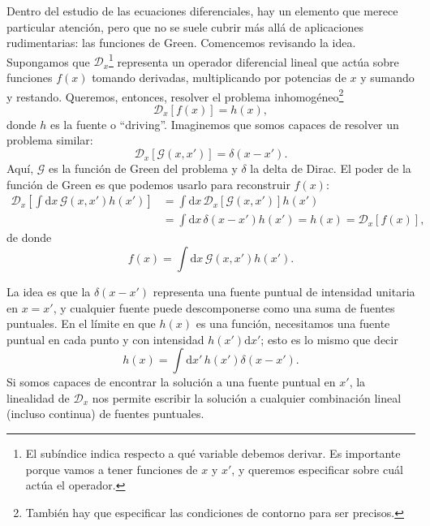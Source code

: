 Dentro del estudio de las ecuaciones diferenciales, hay un elemento que merece particular atención, pero que no se suele cubrir más allá de aplicaciones rudimentarias: las funciones de Green. Comencemos revisando la idea. Supongamos que \(\mathcal{D}_x\)\footnote{El subíndice indica respecto a qué variable debemos derivar. Es importante porque vamos a tener funciones de \(x\) y \(x'\), y queremos especificar sobre cuál actúa el operador.} representa un operador diferencial lineal que actúa sobre funciones \(f(x)\) tomando derivadas, multiplicando por potencias de \(x\) y sumando y restando. Queremos, entonces, resolver el problema inhomogéneo\footnote{También hay que especificar las condiciones de contorno para ser precisos.}
\begin{equation}
    \label{eq.1-green_problem}
    \mathcal{D}_x[f(x)] = h(x),
\end{equation}
donde \(h\) es la fuente o ``driving''. Imaginemos que somos capaces de resolver un problema similar:
\begin{equation}
    \mathcal{D}_x[\mathcal{G}(x, x')] = \delta(x-x').
\end{equation}
Aquí, \(\mathcal{G}\) es la función de Green del problema y \(\delta\) la delta de Dirac. El poder de la función de Green es que podemos usarlo para reconstruir \(f(x)\):
\begin{align*}
    \mathcal{D}_x\left[\int\mathrm{d}x\, \mathcal{G}(x, x') h(x')\right] &= \int\mathrm{d}x\, \mathcal{D}_x \left[\mathcal{G}(x, x')\right] h(x') \\
    &= \int\mathrm{d}x\, \delta(x-x') h(x') = h(x) = \mathcal{D}_x[f(x)],
\end{align*}
de donde
\begin{equation}
    f(x) = \int\mathrm{d}x\, \mathcal{G}(x, x') h(x').
\end{equation}

La idea es que la \(\delta(x-x')\) representa una fuente puntual de intensidad unitaria en \(x = x'\), y cualquier fuente puede descomponerse como una suma de fuentes puntuales. En el límite en que \(h(x)\) es una función, necesitamos una fuente puntual en cada punto y con intensidad \(h(x')\mathrm{d}x'\); esto es lo mismo que decir 
\begin{equation}
    h(x) = \int \mathrm{d}x'\, h(x') \delta(x-x').
\end{equation}
Si somos capaces de encontrar la solución a una fuente puntual en \(x'\), la linealidad de \(\mathcal{D}_x\) nos permite escribir la solución a cualquier combinación lineal (incluso continua) de fuentes puntuales. 

